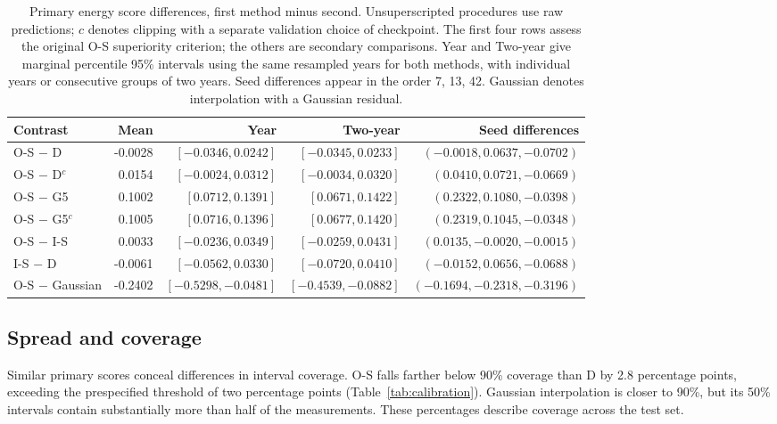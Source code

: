 \documentclass{article}
\begin{document}
\begin{table}[ht]
\centering
\caption{Primary energy score differences, first method minus second. Unsuperscripted procedures use raw predictions; $c$ denotes clipping with a separate validation choice of checkpoint. The first four rows assess the original O-S superiority criterion; the others are secondary comparisons. Year and Two-year give marginal percentile 95\% intervals using the same resampled years for both methods, with individual years or consecutive groups of two years. Seed differences appear in the order 7, 13, 42. Gaussian denotes interpolation with a Gaussian residual.}
\label{tab:contrasts}
\setlength{\tabcolsep}{1.8pt}
\begin{tabular}{@{}lrrrr@{}}
\toprule
Contrast & Mean & Year & Two-year & Seed differences \\
\midrule
O-S $-$ D & -0.0028 & $[-0.0346,0.0242]$ & $[-0.0345,0.0233]$ & $(-0.0018,0.0637,-0.0702)$ \\
O-S $-$ D$^c$ & 0.0154 & $[-0.0024,0.0312]$ & $[-0.0034,0.0320]$ & $(0.0410,0.0721,-0.0669)$ \\
O-S $-$ G5 & 0.1002 & $[0.0712,0.1391]$ & $[0.0671,0.1422]$ & $(0.2322,0.1080,-0.0398)$ \\
O-S $-$ G5$^c$ & 0.1005 & $[0.0716,0.1396]$ & $[0.0677,0.1420]$ & $(0.2319,0.1045,-0.0348)$ \\
O-S $-$ I-S & 0.0033 & $[-0.0236,0.0349]$ & $[-0.0259,0.0431]$ & $(0.0135,-0.0020,-0.0015)$ \\
I-S $-$ D & -0.0061 & $[-0.0562,0.0330]$ & $[-0.0720,0.0410]$ & $(-0.0152,0.0656,-0.0688)$ \\
O-S $-$ Gaussian & -0.2402 & $[-0.5298,-0.0481]$ & $[-0.4539,-0.0882]$ & $(-0.1694,-0.2318,-0.3196)$ \\
\bottomrule
\end{tabular}
\end{table}

\subsection{Spread and coverage}

Similar primary scores conceal differences in interval coverage. O-S falls farther below 90\% coverage than D by 2.8 percentage points, exceeding the prespecified threshold of two percentage points (Table~\ref{tab:calibration}). Gaussian interpolation is closer to 90\%, but its 50\% intervals contain substantially more than half of the measurements. These percentages describe coverage across the test set.
\end{document}
